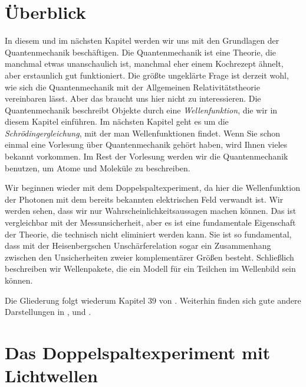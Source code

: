 


\section{Überblick}

In diesem und im nächsten Kapitel werden wir uns mit den Grundlagen der Quantenmechanik beschäftigen. Die Quantenmechanik ist eine Theorie, die manchmal etwas unanschaulich ist, manchmal eher einem Kochrezept ähnelt, aber erstaunlich gut funktioniert. Die größte ungeklärte Frage ist derzeit wohl, wie sich die Quantenmechanik mit der Allgemeinen Relativitätstheorie vereinbaren lässt. Aber das braucht uns hier nicht zu interessieren. Die Quantenmechanik beschreibt Objekte durch eine \emph{Wellenfunktion}, die wir in diesem Kapitel einführen. Im nächsten Kapitel geht es um die \emph{Schrödingergleichung}, mit der man Wellenfunktionen findet.  Wenn Sie schon einmal eine Vorlesung über Quantenmechanik gehört haben, wird Ihnen vieles bekannt vorkommen. Im Rest der Vorlesung werden wir die Quantenmechanik benutzen, um Atome und Moleküle zu beschreiben.

Wir beginnen wieder mit dem Doppelspaltexperiment, da hier die Wellenfunktion der Photonen mit dem bereits bekannten elektrischen Feld verwandt ist. Wir werden sehen, dass wir nur Wahrscheinlichkeitsaussagen machen können. Das ist vergleichbar mit der Messunsicherheit, aber es ist eine fundamentale Eigenschaft der Theorie, die technisch nicht eliminiert werden kann. Sie ist so fundamental, dass mit der Heisenbergschen Unschärferelation sogar ein Zusammenhang zwischen den Unsicherheiten zweier komplementärer Größen besteht. Schließlich beschreiben wir Wellenpakete, die ein Modell für ein Teilchen im Wellenbild sein können.

Die Gliederung folgt wiederum  Kapitel 39 von \cite{Knight_physics}. Weiterhin finden sich gute andere Darstellungen in \cite{Haliday_Resnick}, \cite{Demtröder_ep3} und \cite{Haken_wolf_I}.




\section{Das Doppelspaltexperiment mit Lichtwellen}

